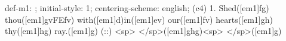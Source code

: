 def-m1: \grealign;
initial-style: 1;
centering-scheme: english;
(c4) 1. Shed([em1]fg) thou([em1]gvFEfv) with([em1]d)in([em1]ev) our([em1]fv) hearts([em1]gh) thy([em1]hg) ray.([em1]g) (::) <sp> </sp>([em1]ghg)<sp> </sp>([em1]g)
